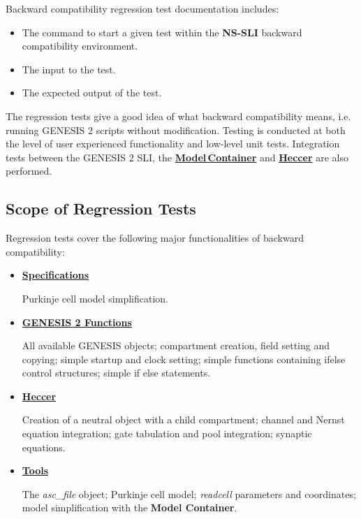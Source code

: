\documentclass[12pt]{article}
\begin{document}
Backward compatibility regression test documentation includes:
\begin{itemize}
\item The command to start a given test within the {\bf NS-SLI} backward compatibility environment.
\item The input to the test.
\item The expected output of the test.
\end{itemize}
The regression tests give a good idea of what backward compatibility means, i.e. running GENESIS 2 scripts without modification. Testing is conducted at both the level of user experienced functionality and low-level unit tests. Integration tests between the GENESIS 2 SLI, the \href{../model-container/model-container.tex}{\bf Model\,Container} and \href{../heccer/heccer.tex}{\bf Heccer} are also performed.

\subsection*{Scope of Regression Tests}

Regression tests cover the following major functionalities of backward compatibility:
\begin{itemize}
\item[]\href{http://www.neurospaces.org/neurospaces_project/ns-sli/tests/html/specifications/main.html}{\bf Specifications}

Purkinje cell model simplification.

\item[]\href{http://www.neurospaces.org/neurospaces_project/ns-sli/tests/html/specifications/core/main.html}{\bf GENESIS 2 Functions}

All available GENESIS objects; compartment creation, field setting and copying; simple startup and clock setting; simple functions containing ifelse control structures; simple if else statements.

\item[]\href{http://www.neurospaces.org/neurospaces_project/ns-sli/tests/html/specifications/heccer/main.html}{\bf Heccer}

Creation of a neutral object with a child compartment; channel and Nernst equation integration; gate tabulation and pool integration; synaptic equations.

\item[]\href{http://www.neurospaces.org/neurospaces_project/ns-sli/tests/html/specifications/tools/main.html}{\bf Tools}

The {\it asc\_file} object; Purkinje cell model; {\it readcell} parameters and coordinates; model simplification with the {\bf Model Container}.

\end{itemize}
\end{document}

